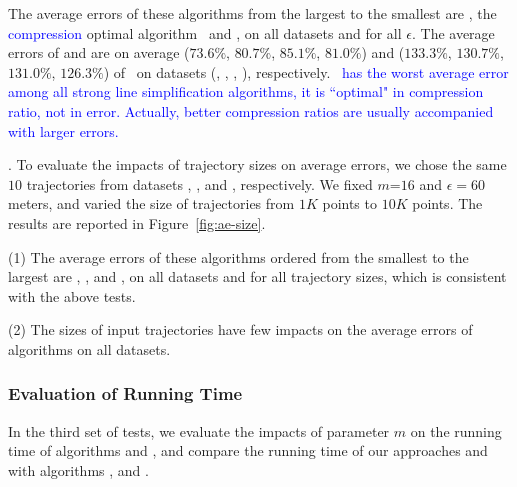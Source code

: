 {The average errors of these algorithms from the largest to the smallest are \cista, the \textcolor{blue}{compression} optimal algorithm \osed~and \cist, on all datasets and for all $\epsilon$.
The average errors of \cist and \cista are on average
($73.6\%$, $80.7\%$, $85.1\%$, $81.0\%$)
and ($133.3\%$, $130.7\%$, $131.0\%$, $126.3\%$)
of \osed~on datasets (\sercar, \geolife, \mopsi, \pricar), respectively.
\textcolor{blue}{\osed~has the worst average error among all strong line simplification algorithms, \ie it is ``optimal" in compression ratio, not in error. Actually, better compression ratios are usually accompanied with larger errors.}

.
To evaluate the impacts of trajectory sizes on average errors, we chose the same
{$10$} trajectories from  datasets \sercar, \geolife, \mopsi and \pricar, respectively.
We fixed {$m$=$16$} and $\epsilon = 60$ meters, and varied the size  of trajectories from $1K$ points to $10K$ points.
%
The results are reported in Figure~\ref{fig:ae-size}.

\ni(1) The average errors of these algorithms ordered from the smallest to the largest are \squishe, \dps, \cist and \cista, on all datasets and for all trajectory sizes, which is consistent with the above tests.

\ni(2) The sizes of input trajectories have few impacts on the average errors of \lsa algorithms on all datasets.



	





\subsubsection{Evaluation of Running Time}

In the third set of tests, we evaluate the impacts of parameter $m$ on the running time of algorithms \cist and \cista, and compare the running time of our approaches \cist and \cista with algorithms \osed, \dps and \squishe.

%

}
